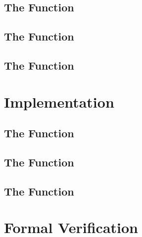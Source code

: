 \subsection{The Function \bitstreamread}
\subsection{The Function }
\subsection{The Function }

\section{Implementation}
\subsection{The Function \bitstreamread}
\subsection{The Function }
\subsection{The Function }

\section{Formal Verification}
\subsection{}
\subsection{}

